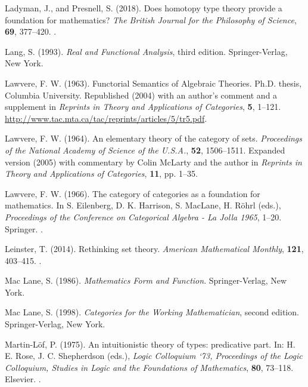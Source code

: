 \documentclass[11pt]{article}
\begin{document}
\begin{thebibliography}{}
Ladyman, J., and Presnell, S. (2018).
\newblock Does homotopy type theory provide a foundation for mathematics?
\newblock \emph{The British Journal for the Philosophy of Science},
    \textbf{69}, 377--420.
\newblock {}.

Lang, S. (1993).
\newblock \emph{Real and Functional Analysis}, third edition.
\newblock Springer-Verlag, New York.

Lawvere, F. W. (1963).
\newblock Functorial Semantics of Algebraic Theories.
\newblock Ph.D. thesis, Columbia University.
\newblock Republished (2004) with an author’s comment and a supplement in
    \emph{Reprints in Theory and Applications of Categories}, \textbf{5},
    1--121.
\newblock \url{http://www.tac.mta.ca/tac/reprints/articles/5/tr5.pdf}.

Lawvere, F. W. (1964).
\newblock An elementary theory of the category of sets.
\newblock \emph{Proceedings of the National Academy of Science of the U.S.A.},
    \textbf{52}, 1506--1511.
\newblock Expanded version (2005) with commentary by Colin McLarty and
    the author in \emph{Reprints in Theory and Applications of Categories},
    \textbf{11}, pp. 1--35.

Lawvere, F. W. (1966).
\newblock The category of categories as a foundation for mathematics.
\newblock In S. Eilenberg, D. K. Harrison, S. MacLane, H. Röhrl (eds.),
    \emph{Proceedings of the Conference on Categorical Algebra - La Jolla
    1965}, 1--20.
\newblock Springer.
\newblock {}.

Leinster, T. (2014).
\newblock Rethinking set theory.
\newblock \emph{American Mathematical Monthly}, \textbf{121}, 403--415.
\newblock {}.

Mac Lane, S. (1986).
\newblock \emph{Mathematics Form and Function}.
\newblock Springer-Verlag, New York.

Mac Lane, S. (1998).
\newblock \emph{Categories for the Working Mathematician}, second edition.
\newblock Springer-Verlag, New York.

Martin-L\"{o}f, P. (1975).
\newblock An intuitionistic theory of types: predicative part.
\newblock In: H. E. Rose, J. C. Shepherdson (eds.),
    \emph{Logic Colloquium ‘73, Proceedings of the Logic Colloquium,
    Studies in Logic and the Foundations of Mathematics}, \textbf{80}, 73--118.
\newblock Elsevier.
\newblock {}.


\end{thebibliography}
\end{document}
